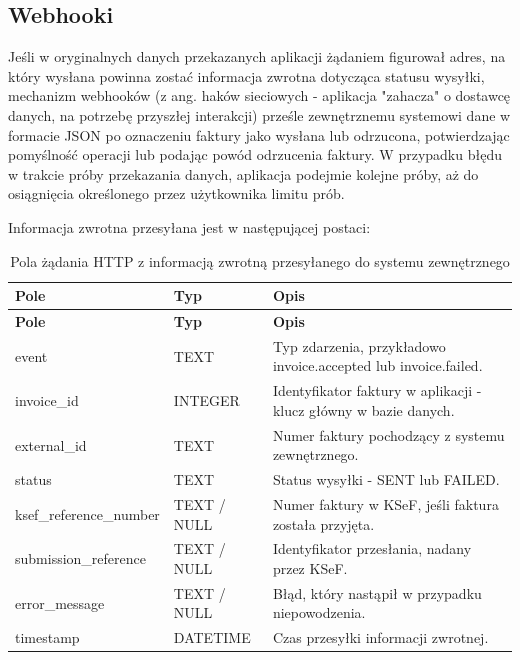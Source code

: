 \subsection{Webhooki}
Jeśli w oryginalnych danych przekazanych aplikacji żądaniem figurował adres, na który wysłana powinna zostać informacja zwrotna dotycząca statusu wysyłki, mechanizm webhooków (z ang. haków sieciowych - aplikacja "zahacza" o dostawcę danych, na potrzebę przyszłej interakcji)
prześle zewnętrznemu systemowi dane w formacie JSON po oznaczeniu faktury jako wysłana lub odrzucona, potwierdzając pomyślność operacji lub podając powód odrzucenia faktury. W przypadku błędu w trakcie próby przekazania danych, aplikacja podejmie kolejne próby, aż do osiągnięcia określonego przez użytkownika limitu prób.

\noindent Informacja zwrotna przesyłana jest w następującej postaci:
\begin{small}
\begin{longtable}{>{\raggedright\arraybackslash}p{4cm} >{\raggedright\arraybackslash}p{2cm} >{\raggedright\arraybackslash}p{7cm}}
\caption{Pola żądania HTTP z informacją zwrotną przesyłanego do systemu zewnętrznego}
\label{tab:webhook_payload} \\
\toprule
\textbf{Pole} & \textbf{Typ} & \textbf{Opis} \\
\midrule
\endfirsthead

\toprule
\textbf{Pole} & \textbf{Typ} & \textbf{Opis} \\
\midrule
\endhead

\bottomrule
\endfoot

event & TEXT & Typ zdarzenia, przykładowo invoice.accepted lub invoice.failed. \\
invoice\_id & INTEGER & Identyfikator faktury w aplikacji - klucz główny w bazie danych. \\
external\_id & TEXT & Numer faktury pochodzący z systemu zewnętrznego. \\
status & TEXT & Status wysyłki - SENT lub FAILED. \\
ksef\_reference\_number & TEXT / NULL & Numer faktury w KSeF, jeśli faktura została przyjęta. \\
submission\_reference & TEXT / NULL & Identyfikator przesłania, nadany przez KSeF. \\
error\_message & TEXT / NULL & Błąd, który nastąpił w przypadku niepowodzenia. \\
timestamp & DATETIME & Czas przesyłki informacji zwrotnej. \\
\end{longtable}
\end{small}

